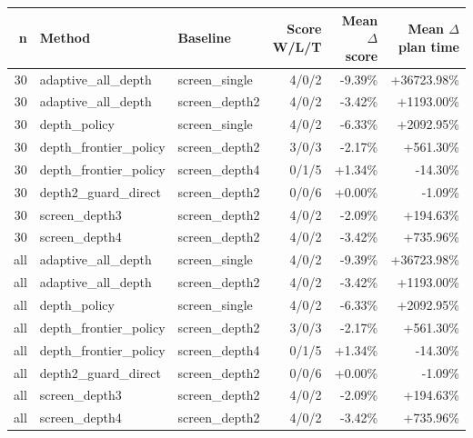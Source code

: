 \begin{tabular}{rllrrr}
\toprule
n & Method & Baseline & Score W/L/T & Mean $\Delta$ score & Mean $\Delta$ plan time \\
\midrule
30 & adaptive\_all\_depth & screen\_single & 4/0/2 & -9.39\% & +36723.98\% \\
30 & adaptive\_all\_depth & screen\_depth2 & 4/0/2 & -3.42\% & +1193.00\% \\
30 & depth\_policy & screen\_single & 4/0/2 & -6.33\% & +2092.95\% \\
30 & depth\_frontier\_policy & screen\_depth2 & 3/0/3 & -2.17\% & +561.30\% \\
30 & depth\_frontier\_policy & screen\_depth4 & 0/1/5 & +1.34\% & -14.30\% \\
30 & depth2\_guard\_direct & screen\_depth2 & 0/0/6 & +0.00\% & -1.09\% \\
30 & screen\_depth3 & screen\_depth2 & 4/0/2 & -2.09\% & +194.63\% \\
30 & screen\_depth4 & screen\_depth2 & 4/0/2 & -3.42\% & +735.96\% \\
all & adaptive\_all\_depth & screen\_single & 4/0/2 & -9.39\% & +36723.98\% \\
all & adaptive\_all\_depth & screen\_depth2 & 4/0/2 & -3.42\% & +1193.00\% \\
all & depth\_policy & screen\_single & 4/0/2 & -6.33\% & +2092.95\% \\
all & depth\_frontier\_policy & screen\_depth2 & 3/0/3 & -2.17\% & +561.30\% \\
all & depth\_frontier\_policy & screen\_depth4 & 0/1/5 & +1.34\% & -14.30\% \\
all & depth2\_guard\_direct & screen\_depth2 & 0/0/6 & +0.00\% & -1.09\% \\
all & screen\_depth3 & screen\_depth2 & 4/0/2 & -2.09\% & +194.63\% \\
all & screen\_depth4 & screen\_depth2 & 4/0/2 & -3.42\% & +735.96\% \\
\bottomrule
\end{tabular}
